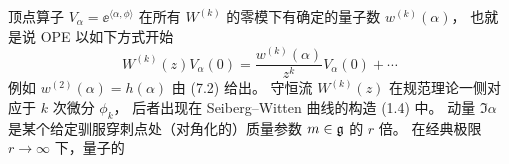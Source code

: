 顶点算子 $V_\alpha=\ee^{\langle\alpha,\phi\rangle}$ 在所有 $W^{(k)}$ 的零模下有确定的量子数 $w^{(k)}(\alpha)$，
也就是说 OPE 以如下方式开始
\begin{equation}
W^{(k)}(z)V_\alpha(0)=\frac{w^{(k)}(\alpha)}{z^k}V_\alpha(0)+\cdots
\tag{7.3}
\end{equation}
例如 $w^{(2)}(\alpha)=h(\alpha)$ 由 (7.2) 给出。
守恒流 $W^{(k)}(z)$ 在规范理论一侧对应于 $k$ 次微分 $\phi_k$，
后者出现在 Seiberg--Witten 曲线的构造 (1.4) 中。
动量 $\Im\alpha$ 是某个给定驯服穿刺点处（对角化的）质量参数 $m\in\mathfrak{g}$ 的 $r$ 倍。
在经典极限 $r\to\infty$ 下，量子的


